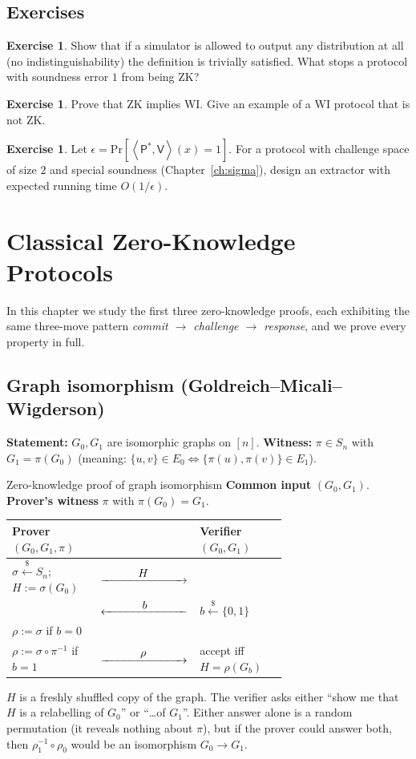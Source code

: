 \documentclass[11pt,a4paper]{report}
\makeatletter
\theoremstyle{plain}
\theoremstyle{definition}
\newtheorem{exercise}[theorem]{Exercise}
\theoremstyle{remark}
\newcommand{\getsr}{\xleftarrow{\$}}
\renewcommand{\Pr}{\mathrm{Pr}}
\newcommand{\Prv}{\mathsf{P}}\newcommand{\Ver}{\mathsf{V}}
\newcommand{\pair}[2]{\left\langle #1,#2\right\rangle}
\newcommand{\ra}[1]{\xrightarrow{\makebox[2.5cm]{$#1$}}}
\newcommand{\la}[1]{\xleftarrow{\makebox[2.5cm]{$#1$}}}
\newcommand{\inv}{^{-1}}
\newenvironment{flow}[2]{%
  \par\smallskip\noindent
  \begin{tabular}{@{}L{0.34\linewidth} c L{0.34\linewidth}@{}}
  \textbf{#1} & & \textbf{#2}\\ \hline}{\end{tabular}\par\smallskip}
\makeatother
\begin{document}
\section*{Exercises}
\begin{exercise}
Show that if a simulator is allowed to output any distribution at all (no indistinguishability) the definition is trivially satisfied. What stops a protocol with soundness error $1$ from being ZK?
\end{exercise}
\begin{exercise}
Prove that ZK implies WI. Give an example of a WI protocol that is not ZK.
\end{exercise}
\begin{exercise}\label{ex:extractor}
Let $\epsilon=\Pr[\pair{\Prv^*}{\Ver}(x)=1]$. For a protocol with challenge space of size $2$ and special soundness (Chapter~\ref{ch:sigma}), design an extractor with expected running time $O(1/\epsilon)$.
\end{exercise}

\chapter{Classical Zero-Knowledge Protocols}
\label{ch:classical}
In this chapter we study the first three zero-knowledge proofs, each exhibiting the same three-move pattern \emph{commit $\to$ challenge $\to$ response}, and we prove every property in full.

\section{Graph isomorphism (Goldreich--Micali--Wigderson)}
\label{sec:gi}
\textbf{Statement:} $G_0,G_1$ are isomorphic graphs on $[n]$. \textbf{Witness:} $\pi\in S_n$ with $G_1=\pi(G_0)$ (meaning: $\{u,v\}\in E_0\iff\{\pi(u),\pi(v)\}\in E_1$).

\begin{protocol}[label=pr:gi]{Zero-knowledge proof of graph isomorphism}
\textbf{Common input} $(G_0,G_1)$. \textbf{Prover's witness} $\pi$ with $\pi(G_0)=G_1$.
\begin{flow}{Prover $(G_0,G_1,\pi)$}{Verifier $(G_0,G_1)$}
$\sigma\getsr S_n$; $H:=\sigma(G_0)$ & $\ra{H}$ & \\
 & $\la{b}$ & $b\getsr\{0,1\}$\\
$\rho:=\sigma$ if $b=0$ & & \\
$\rho:=\sigma\circ\pi\inv$ if $b=1$ & $\ra{\rho}$ & accept iff $H=\rho(G_b)$
\end{flow}
\end{protocol}
\begin{intuition}
$H$ is a freshly shuffled copy of the graph. The verifier asks either ``show me that $H$ is a relabelling of $G_0$'' or ``\ldots of $G_1$''. Either answer alone is a random permutation (it reveals nothing about $\pi$), but if the prover could answer both, then $\rho_1\inv\circ\rho_0$ would be an isomorphism $G_0\to G_1$.
\end{intuition}
\end{document}
